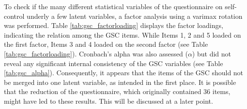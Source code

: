To check if the many different statistical variables of the questionnaire on self-control underly a few latent variables, a factor analysis using a varimax rotation was performed. Table \ref{tab:gsc_factorloading} displays the factor loadings, indicating the relation among the GSC items. While Items 1, 2 and 5 loaded on the first factor, Items 3 and 4 loaded on the second factor (see Table \ref{tab:gsc_factorloading}). Cronbach’s alpha was also assessed ($\alpha$) but did not reveal any significant internal consistency of the GSC variables (see Table \ref{tab:gsc_alpha}). Consequently, it appears that the items of the GSC should not be merged into one latent variable, as intended in the first place. It is possible that the reduction of the questionnaire, which originally contained 36 items, might have led to these results. This will be discussed at a later point.\par

